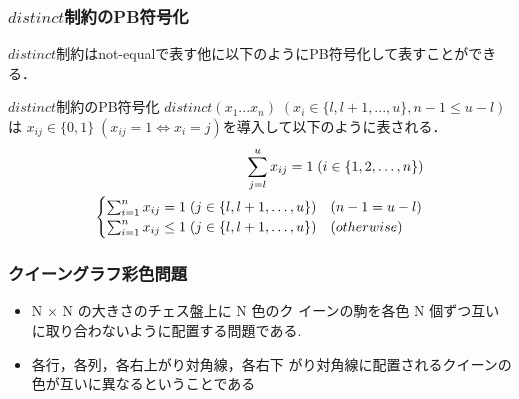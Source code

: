\documentclass [dvipdfmx,12pt]{beamer}
\newcommand{\distinct}{$distinct$}
\begin{document}
\begin{frame}
    \frametitle{\distinct 制約のPB符号化}
    \distinct 制約はnot-equalで表す他に以下のようにPB符号化して表すことができる．
    \begin{block}{ \distinct 制約のPB符号化}
        $distinct(x_1 ... x_n) \; (x_i \in \{l, l+1, ..., u\}, n-1 \leq u-l)$は
        $x_{ij} \in \{0,1\} \; (x_{ij}=1 \Leftrightarrow x_i=j)$を導入して以下のように表される．
        \begin{eqnarray}
            \sum_{j=l}^{u} x_{ij}=1 \; (i \in \{1,2,\ldots,n\}) \label{eq:pb_1}\\
    \vspace{-3mm}
            \begin{cases}
                \sum_{i=1}^{n} x_{ij} = 1 \; (j \in \{l,l+1,\ldots,u\}) & (n-1=u-l) \\
                \sum_{i=1}^{n} x_{ij} \leq 1 \; (j \in \{l,l+1,\ldots,u\}) & (otherwise)
            \end{cases}\label{eq:pb_2}
        \end{eqnarray}
    \end{block}
\end{frame}


\begin{frame}
    \frametitle{クイーングラフ彩色問題}
    
    \begin{itemize}
        \item N × N の大きさのチェス盤上に N 色のク イーンの駒を各色 N 個ずつ互いに取り合わないように配置する問題である.
        \item 各行，各列，各右上がり対角線，各右下 がり対角線に配置されるクイーンの色が互いに異なるということである
    \end{itemize}
\end{frame}
\end{document}
